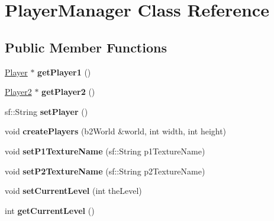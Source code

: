 \hypertarget{class_player_manager}{}\section{Player\+Manager Class Reference}
\label{class_player_manager}
\subsection*{Public Member Functions}
\begin{DoxyCompactItemize}
\item 
\hyperlink{class_player}{Player} $\ast$ {\bfseries get\+Player1} ()\hypertarget{class_player_manager_a394eef64db861691add3b7bc8324d2a8}{}\label{class_player_manager_a394eef64db861691add3b7bc8324d2a8}

\item 
\hyperlink{class_player2}{Player2} $\ast$ {\bfseries get\+Player2} ()\hypertarget{class_player_manager_a33a2e761fa0e24e634ff508e3d2d90e5}{}\label{class_player_manager_a33a2e761fa0e24e634ff508e3d2d90e5}

\item 
sf\+::\+String {\bfseries set\+Player} ()\hypertarget{class_player_manager_a4ece06b6b6219c96c3d16b92dbc8e46b}{}\label{class_player_manager_a4ece06b6b6219c96c3d16b92dbc8e46b}

\item 
void {\bfseries create\+Players} (b2\+World \&world, int width, int height)\hypertarget{class_player_manager_a5d3fcce83c6bf4b8af899c4e16c212cb}{}\label{class_player_manager_a5d3fcce83c6bf4b8af899c4e16c212cb}

\item 
void {\bfseries set\+P1\+Texture\+Name} (sf\+::\+String p1\+Texture\+Name)\hypertarget{class_player_manager_ae90793f316a9fe47652a4206cf7d31ad}{}\label{class_player_manager_ae90793f316a9fe47652a4206cf7d31ad}

\item 
void {\bfseries set\+P2\+Texture\+Name} (sf\+::\+String p2\+Texture\+Name)\hypertarget{class_player_manager_a9e534cb7461c2625d5d542edb3f7d278}{}\label{class_player_manager_a9e534cb7461c2625d5d542edb3f7d278}

\item 
void {\bfseries set\+Current\+Level} (int the\+Level)\hypertarget{class_player_manager_a030cf7edda522509ad680d955a6019e1}{}\label{class_player_manager_a030cf7edda522509ad680d955a6019e1}

\item 
int {\bfseries get\+Current\+Level} ()\hypertarget{class_player_manager_aafea2307cadcbacd50f0b03a840854b2}{}\label{class_player_manager_aafea2307cadcbacd50f0b03a840854b2}


\end{DoxyCompactItemize}
